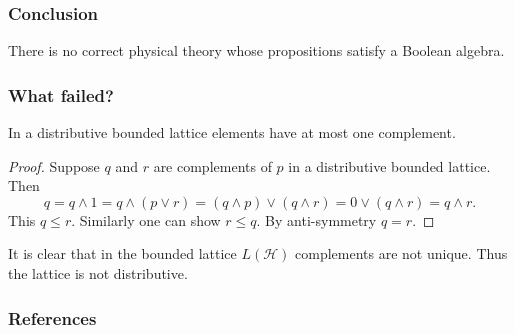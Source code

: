 \documentclass{beamer}
\begin{document}
\begin{frame}

	\frametitle{Conclusion}
	
	\Huge There is no correct physical theory whose propositions satisfy a Boolean algebra.

\end{frame}

\begin{frame}

	\frametitle{What failed?}
	
	\begin{theorem}
		
		In a distributive bounded lattice elements have at most one complement.		
		
	\end{theorem}
	
	\begin{proof}
	
		Suppose $q$ and $r$ are complements of $p$ in a distributive bounded lattice. Then
		\begin{equation}
			q=q\wedge 1=q\wedge(p\vee r)=(q\wedge p)\vee(q\wedge r)=0\vee(q\wedge r)=q\wedge r.
		\end{equation}			
		This $q\leq r$. Similarly one can show $r\leq q$. By anti-symmetry $q=r$.
	\end{proof}

It is clear that in the bounded lattice $L(\mathcal{H})$ complements are not unique. Thus the lattice is not distributive.

\end{frame}
	
\begin{frame}[allowframebreaks]
	
	\frametitle{References}

	
	

\end{frame}
\end{document}
